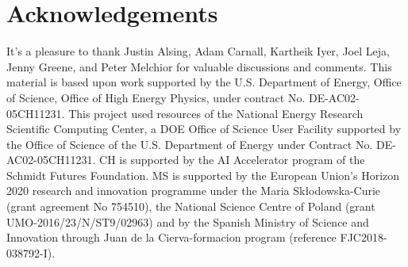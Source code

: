 \documentclass[12pt, letterpaper, preprint]{aastex63}
\begin{document}
\section*{Acknowledgements}
It's a pleasure to thank
    Justin Alsing, 
    Adam Carnall, 
    Kartheik Iyer, 
    Joel Leja, 
    Jenny Greene, 
    and 
    Peter Melchior
for valuable discussions and comments. 
This material is based upon work supported by the U.S. Department of Energy,
Office of Science, Office of High Energy Physics, under contract No.
DE-AC02-05CH11231.  This project used resources of the National Energy Research
Scientific Computing Center, a DOE Office of Science User Facility supported by
the Office of Science of the U.S.  Department of Energy under Contract No.
DE-AC02-05CH11231. 
CH is supported by the AI Accelerator program of the Schmidt Futures Foundation.
MS is supported by the European Union's  Horizon 2020 research and innovation
programme under the Maria Sk\l{}odowska-Curie (grant agreement No 754510), the
National Science Centre of Poland (grant UMO-2016/23/N/ST9/02963) and by the
Spanish Ministry of Science and Innovation through Juan de la Cierva-formacion
program (reference FJC2018-038792-I).

\appendix



% 
% 


 
\end{document}

